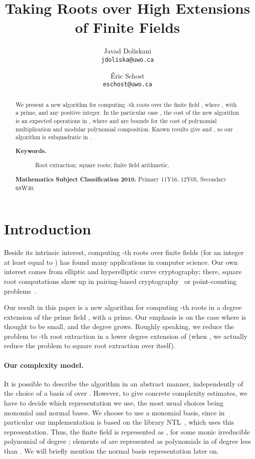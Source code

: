 \documentclass[12pt]{article}
\title{Taking Roots over High Extensions \\ of Finite Fields}
\author{Javad Doliskani \\ \texttt{jdoliska@uwo.ca} 
\and
\'{E}ric Schost \\ \texttt{eschost@uwo.ca}}
\date{}
\theoremstyle{plain}
\theoremstyle{definition}
\newcounter{algorithm}
\newcommand{\keywords}[1]{\begin{description} \item[\textbf{Keywords.}] #1 \end{description}}
\begin{document}
\maketitle

\begin{abstract}
We present a new algorithm for computing -th roots over the finite
field , where , with  a prime, and  any positive
integer. In the particular case , the cost of the new algorithm
is an expected  operations in
, where  and  are bounds for the cost of
polynomial multiplication and modular polynomial composition. Known
results give  and , so our algorithm is subquadratic in .  
\keywords{Root extraction; square roots; finite field arithmetic.}
\textbf{Mathematics Subject Classification 2010.} Primary 11Y16, 12Y05, Secondary 68W30.
\end{abstract}



\section{Introduction}\label{section:intro}

Beside its intrinsic interest, computing -th roots over finite
fields (for  an integer at least equal to ) has found many
applications in computer science. Our own interest comes from elliptic
and hyperelliptic curve cryptography; there, square root computations
show up in pairing-based cryptography~\cite{BaKiLySc02} or
point-counting problems~\cite{GaSc10}.


Our result in this paper is a new algorithm for computing -th roots
in a degree  extension  of the prime field , with  a
prime. Our emphasis is on the case where  is thought to be small,
and the degree  grows. Roughly speaking, we reduce the problem to
-th root extraction in a lower degree extension of  (when
, we actually reduce the problem to square root extraction over
 itself).



\paragraph{Our complexity model.}
It is possible to describe the algorithm in an abstract manner,
independently of the choice of a basis of  over . However,
to give concrete complexity estimates, we have to decide which
representation we use, the most usual choices being monomial and
normal bases. We choose to use a monomial basis, since in particular
our implementation is based on the library NTL~\cite{NTL2009}, which
uses this representation.  Thus, the finite field  is
represented as , for some monic irreducible
polynomial  of degree ; elements of  are
represented as polynomials in  of degree less than . We
will briefly mention the normal basis representation later on.
\end{document}
